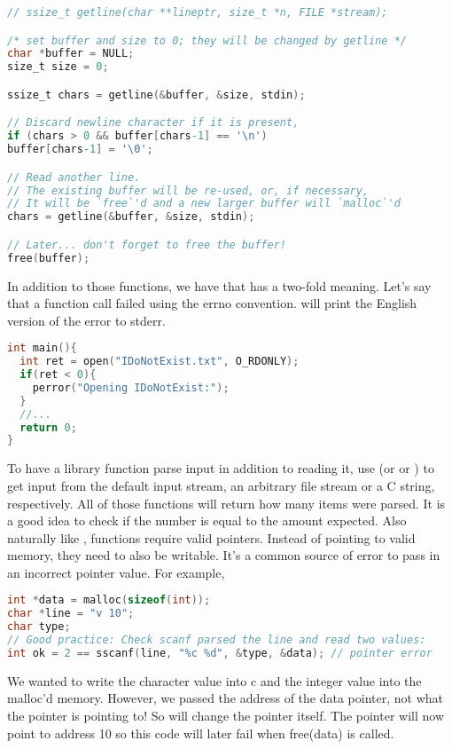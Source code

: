 \begin{lstlisting}[language=C]
// ssize_t getline(char **lineptr, size_t *n, FILE *stream);

/* set buffer and size to 0; they will be changed by getline */
char *buffer = NULL;
size_t size = 0;

ssize_t chars = getline(&buffer, &size, stdin);

// Discard newline character if it is present,
if (chars > 0 && buffer[chars-1] == '\n')
buffer[chars-1] = '\0';

// Read another line.
// The existing buffer will be re-used, or, if necessary,
// It will be `free`'d and a new larger buffer will `malloc`'d
chars = getline(&buffer, &size, stdin);

// Later... don't forget to free the buffer!
free(buffer);
\end{lstlisting}

In addition to those functions, we have  that has a two-fold meaning.
Let's say that a function call failed using the errno convention.
 will print the English version of the error to stderr.

\begin{lstlisting}[language=C]
int main(){
  int ret = open("IDoNotExist.txt", O_RDONLY);
  if(ret < 0){
    perror("Opening IDoNotExist:");
  }
  //...
  return 0;
}
\end{lstlisting}

To have a library function parse input in addition to reading it, use  (or  or ) to get input from the default input stream, an arbitrary file stream or a C string, respectively.
All of those functions will return how many items were parsed.
It is a good idea to check if the number is equal to the amount expected.
Also naturally like ,  functions require valid pointers.
Instead of pointing to valid memory, they need to also be writable.
It's a common source of error to pass in an incorrect pointer value.
For example,

\begin{lstlisting}[language=C]
int *data = malloc(sizeof(int));
char *line = "v 10";
char type;
// Good practice: Check scanf parsed the line and read two values:
int ok = 2 == sscanf(line, "%c %d", &type, &data); // pointer error
\end{lstlisting}

We wanted to write the character value into c and the integer value into the malloc'd memory.
However, we passed the address of the data pointer, not what the pointer is pointing to!
So  will change the pointer itself.
The pointer will now point to address 10 so this code will later fail when free(data) is called.

